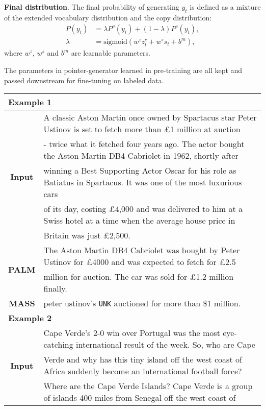 \documentclass[11pt,a4paper]{article}
\newcommand{\method}{PALM\xspace}
\begin{document}
\textbf{Final distribution}. The final probability of generating $y_t$ is defined as a mixture of the extended vocabulary distribution and the copy distribution:
\begin{align}
    P(y_t)&=\lambda P^v(y_t) + (1-\lambda) P^c(y_t),\\
    \lambda&=\text{sigmoid}(w^z z_t^c + w^s s_t + b^m),
\end{align}
where $w^z$, $w^s$ and $b^m$ are learnable parameters.

The parameters in pointer-generator learned in pre-training are all kept and passed downstream for fine-tuning on labeled data.

\begin{table*}[t]
\center\small
\begin{tabular}{ c | l }
\hline\hline
\multicolumn{2}{l}{\textbf{Example 1}}\\
\hline
\multirow{5}{*}{\textbf{Input}} & A classic Aston Martin once owned by Spartacus star Peter Ustinov is set to fetch more than \pounds 1 million at auction\\
& - twice what it fetched four years ago. The actor bought the Aston Martin DB4 Cabriolet in 1962, shortly after\\
& winning a Best Supporting Actor Oscar for his role as Batiatus in Spartacus. It was one of the most luxurious cars\\
& of its day, costing \pounds 4,000 and was delivered to him at a Swiss hotel at a time when the average house price in\\
& Britain was just \pounds 2,500.\\
\hline
\multirow{2}{*}{\textbf{\method}} & The Aston Martin DB4 Cabriolet was bought by Peter Ustinov for \pounds 4000 and was expected to fetch for \pounds 2.5\\
& million for auction. The car was sold for \pounds 1.2 million finally.\\
\hline
\textbf{MASS} & peter ustinov's \texttt{UNK} auctioned for more than \$1 million.\\
\hline\hline
\multicolumn{2}{l}{\textbf{Example 2}}\\
\hline
\multirow{6}{*}{\textbf{Input}} & Cape Verde's 2-0 win over Portugal was the most eye-catching international result of the week. So, who are Cape\\
& Verde and why has this tiny island off the west coast of Africa suddenly become an international football force?\\
& Where are the Cape Verde Islands? Cape Verde is a group of islands 400 miles from Senegal off the west coast of\\

\end{tabular}
\end{table*}
\end{document}
